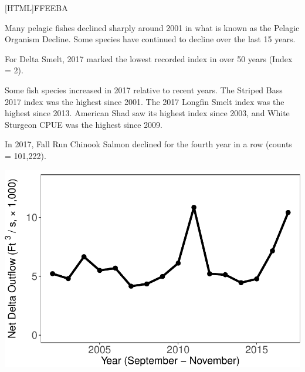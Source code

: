 \documentclass[]{article}\usepackage[]{graphicx}\usepackage[]{color}
\makeatletter
\def\maxwidth{ %
  \ifdim\Gin@nat@width>\linewidth
    \linewidth
  \else
    \Gin@nat@width
  \fi
}
\makeatother
\begin{document}
\begin{Row}
  \begin{Cell}{2}
    \setlength{\fboxrule}{1.7pt}
    [HTML]{FFEEBA}{\parbox{\textwidth}{
			\begin{itemize}[leftmargin=*]
				{\large 
					\item Many pelagic fishes declined sharply around 2001 in what is known as 
					the Pelagic Organism Decline. Some species have continued to decline over the 
					last 15 years.
					\item For Delta Smelt, 2017 marked the lowest recorded index in over 50 
					years (Index = 2).
					\item Some fish species increased in 2017 relative to recent years. The 
					Striped Bass 2017 index was the highest since 2001. The 2017 Longfin Smelt 
					index was the highest since 2013. American Shad saw its highest index since 
					2003, and White Sturgeon CPUE was the highest since 2009.
					\item In 2017, Fall Run Chinook Salmon declined for the fourth year in a 
					row (counts = 101,222).
				}
			\end{itemize}
    }}
  \end{Cell}
  \begin{Cell}{1}
    \vspace{-4.0cm}


{\centering \includegraphics[width=\maxwidth]{figures/flow_fig_4-1} 

}



  \end{Cell}
\end{Row}
\end{document}
